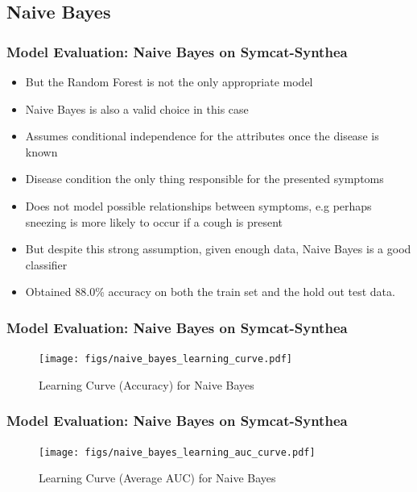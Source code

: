 \documentclass{beamer}
\begin{document}
		\subsection{Naive Bayes}
		\begin{frame}
			\frametitle{Model Evaluation: Naive Bayes on Symcat-Synthea}
			\begin{itemize}
				\item But the Random Forest is not the only appropriate model
				\item Naive Bayes is also a valid choice in this case
				\item Assumes conditional independence for the attributes once the disease is known
				\item Disease condition the only thing responsible for the presented symptoms
				\item Does not model possible relationships between symptoms, e.g perhaps sneezing is more likely to occur if a cough is present
				\item But despite this strong assumption, given enough data, Naive Bayes is a good classifier
				\item Obtained 88.0\% accuracy on both the train set and the hold out test data.
			\end{itemize}
		\end{frame}
	
		\begin{frame}
			\frametitle{Model Evaluation: Naive Bayes on Symcat-Synthea}
			\begin{figure}
				\texttt{[image: figs/naive\_bayes\_learning\_curve.pdf]}
				\caption{Learning Curve (Accuracy) for Naive Bayes}
			\end{figure}
		\end{frame}
	
		\begin{frame}
			\frametitle{Model Evaluation: Naive Bayes on Symcat-Synthea}
			\begin{figure}
				\texttt{[image: figs/naive\_bayes\_learning\_auc\_curve.pdf]}
				\caption{Learning Curve (Average AUC) for Naive Bayes}
			\end{figure}
		\end{frame}
	
\end{document}
